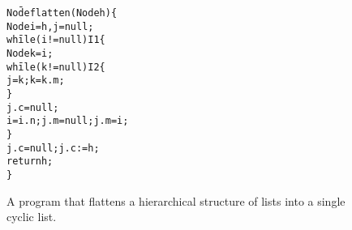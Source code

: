 \documentclass[11pt,a4paper,oneside,draft]{article}
\theoremstyle{definition}
\theoremstyle{remark}
\begin{document}
\begin{figure}
\begin{alltt}\small
\begin{tabbing}
No\=de flatten(Node h) \{\+\\
Node i = h, j = null;\\
wh\=ile (i != null) I1 \{\+\\
Node k = i;\\
wh\=ile (k != null) I2 \{\+\\
j = k; k = k.m;\-\\
\}\\
j.c = null;\\
i = i.n; j.m = null; j.m = i;\-\\
\}\\
j.c = null; j.c := h;\\
return h;\-\\
\}
\end{tabbing}
\end{alltt}
\caption{\label{Fi:flatten}A program that flattens a hierarchical structure of lists into a single cyclic list.}
\end{figure}

\newpage
\end{document}
